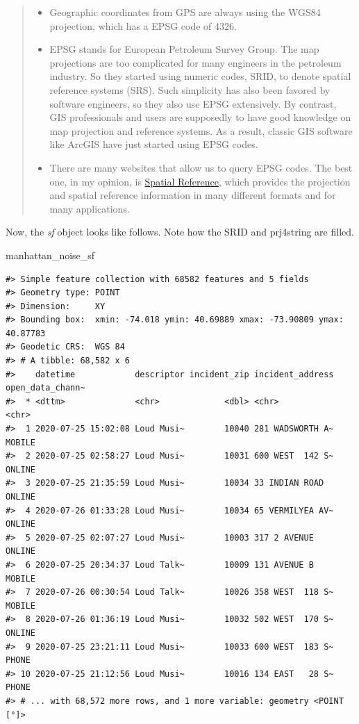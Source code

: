 \documentclass[
  11pt,
]{book}
\newenvironment{Shaded}{\begin{snugshade}}{\end{snugshade}}
\newcommand{\NormalTok}[1]{#1}
\providecommand{\tightlist}{%
  \setlength{\itemsep}{0pt}\setlength{\parskip}{0pt}}
\begin{document}
\begin{quote}
\begin{itemize}
\tightlist
\item
  Geographic coordinates from GPS are always using the WGS84 projection, which has a EPSG code of 4326.
\item
  EPSG stands for European Petroleum Survey Group. The map projections are too complicated for many engineers in the petroleum industry. So they started using numeric codes, SRID, to denote spatial reference systems (SRS). Such simplicity has also been favored by software engineers, so they also use EPSG extensively. By contrast, GIS professionals and users are supposedly to have good knowledge on map projection and reference systems. As a result, classic GIS software like ArcGIS have just started using EPSG codes.\\
\item
  There are many websites that allow us to query EPSG codes. The best one, in my opinion, is \href{https://spatialreference.org/}{Spatial Reference}, which provides the projection and spatial reference information in many different formats and for many applications.
\end{itemize}
\end{quote}

Now, the \emph{sf} object looks like follows. Note how the SRID and prj4string are filled.

\begin{Shaded}
\begin{Highlighting}[]
\NormalTok{manhattan\_noise\_sf}
\end{Highlighting}
\end{Shaded}

\begin{verbatim}
#> Simple feature collection with 68582 features and 5 fields
#> Geometry type: POINT
#> Dimension:     XY
#> Bounding box:  xmin: -74.018 ymin: 40.69889 xmax: -73.90809 ymax: 40.87783
#> Geodetic CRS:  WGS 84
#> # A tibble: 68,582 x 6
#>    datetime            descriptor incident_zip incident_address open_data_chann~
#>  * <dttm>              <chr>             <dbl> <chr>            <chr>           
#>  1 2020-07-25 15:02:08 Loud Musi~        10040 281 WADSWORTH A~ MOBILE          
#>  2 2020-07-25 02:58:27 Loud Musi~        10031 600 WEST  142 S~ ONLINE          
#>  3 2020-07-25 21:35:59 Loud Musi~        10034 33 INDIAN ROAD   ONLINE          
#>  4 2020-07-26 01:33:28 Loud Musi~        10034 65 VERMILYEA AV~ ONLINE          
#>  5 2020-07-25 02:07:27 Loud Musi~        10003 317 2 AVENUE     ONLINE          
#>  6 2020-07-25 20:34:37 Loud Talk~        10009 131 AVENUE B     MOBILE          
#>  7 2020-07-26 00:30:54 Loud Talk~        10026 358 WEST  118 S~ MOBILE          
#>  8 2020-07-26 01:36:19 Loud Musi~        10032 502 WEST  170 S~ ONLINE          
#>  9 2020-07-25 23:21:11 Loud Musi~        10033 600 WEST  183 S~ PHONE           
#> 10 2020-07-25 21:12:56 Loud Musi~        10016 134 EAST   28 S~ PHONE           
#> # ... with 68,572 more rows, and 1 more variable: geometry <POINT [°]>
\end{verbatim}
\end{document}

